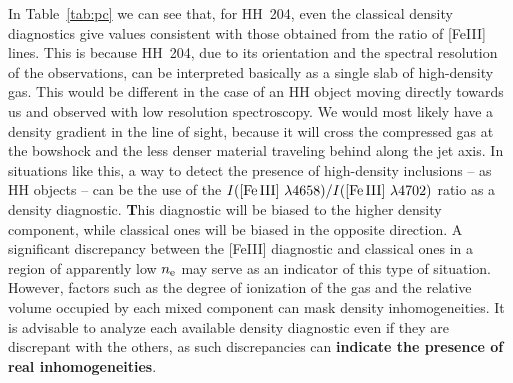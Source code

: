 \documentclass[twocolumn,linenumbers]{aastex63}
\newcommand{\eduardo}[1]{{\color{teal}E: #1}}
\begin{document}

In Table~\ref{tab:pc} we can see that, for HH~204, even the classical density diagnostics give values consistent with those obtained from the ratio of [Fe\thinspace III] lines. This is because HH~204, due to its orientation and the spectral resolution of the observations, can be interpreted basically as a single slab of high-density gas. This would be different in the case of an HH object moving directly towards us and observed with low resolution spectroscopy. We would most likely have a density gradient in the line of sight, because it will cross the compressed gas at the bowshock and the less denser material traveling behind along the jet axis. In situations like this, a way to detect the presence of high-density inclusions -- as HH objects -- can be the use of the $I(\text{[Fe\thinspace III] } \lambda 4658)/I(\text{[Fe\thinspace III] } \lambda 4702)$ ratio as a density diagnostic. {\bf T}his diagnostic will be biased to the higher density component, while classical ones will be biased in the opposite direction. A significant discrepancy between the [Fe\thinspace III] diagnostic and classical ones in a region of apparently low $n_{\rm e}$ may serve as an indicator of this type of situation. However, factors such as the degree of ionization of the gas and the relative volume occupied by each mixed component can mask density inhomogeneities. It is advisable to analyze each available density diagnostic even if they are discrepant with the others, as such discrepancies can {\bf indicate the presence of real inhomogeneities}.   
\end{document}
